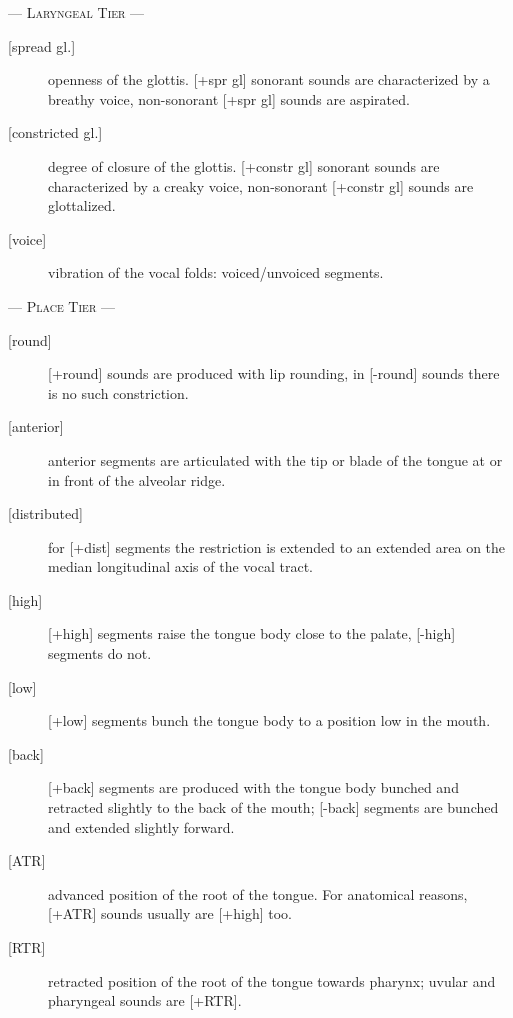 \documentclass[11pt, oneside]{article}   	%
\begin{document}
\begin{tcolorbox}
\begin{center} --- {\scshape Laryngeal Tier} --- \end{center}
\vspace{-2em}
\begin{description}
	\item[{[spread gl.]}] openness of the glottis. [+spr gl] sonorant sounds are  characterized by a breathy voice, non-sonorant [+spr gl] sounds are aspirated.
	\item[{[constricted gl.]}] degree of closure of the glottis. [+constr gl] sonorant sounds are characterized by a creaky voice, non-sonorant [+constr gl] sounds are glottalized.
	\item[{[voice]}] vibration of the vocal folds: voiced/unvoiced segments.
\end{description}
\vspace{-2em}

\begin{center} --- {\scshape Place Tier} --- \end{center}
\vspace{-2em}
\begin{description}
	\item[{[round]}]	[+round] sounds are produced with lip rounding, in [-round] sounds there is no such constriction.
	\item[{[anterior]}] anterior segments are articulated with the tip or blade of the tongue at or in front of the alveolar ridge.
	\item[{[distributed]}] for [+dist] segments the restriction is extended to an extended area on the median longitudinal axis of the vocal tract.
	\item[{[high]}] [+high] segments raise the tongue body close to the palate, [-high] segments do not.
	\item[{[low]}] [+low] segments bunch the tongue body to a position low in the mouth.
	\item[{[back]}] [+back] segments are produced with the tongue body bunched and retracted slightly to the back of the mouth; [-back] segments are bunched and extended slightly forward.
	\item[{[ATR]}] advanced position of the root of the tongue. For anatomical reasons, [+ATR] sounds usually are [+high] too.
	\item[{[RTR]}] retracted position of  the  root  of  the  tongue  towards  pharynx;  uvular   and  pharyngeal sounds are [+RTR].
\end{description}

\end{tcolorbox}
\end{document}

